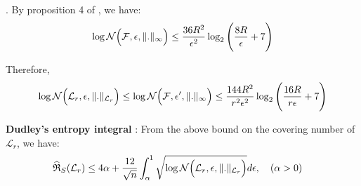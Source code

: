 \noindent \color{red}{Note that in $(*)$, we can equate the covering number with respect to $\|.\|_\infty$ of $\F$ with $W$ because we assume that $\|x\|_2\le 1$}.\color{black} By proposition 4 of \cite{article:ledent_and_mustafa}, we have:
\begin{align*}
    \log \mathcal{N}\Big( \mathcal{F}, \epsilon, \|.\|_\infty \Big) \le \frac{36R^2}{\epsilon^2} \log_2\Bigg( 
        \frac{8R}{\epsilon} + 7
     \Bigg)
\end{align*}

\noindent Therefore,
\begin{align*}
    \log \mathcal{N}\Big( \mathcal{L}_r, \epsilon, \|.\|_{\mathcal{L}_r} \Big) \le \log \mathcal{N}\Big( \mathcal{F}, \epsilon', \|.\|_\infty \Big) \le \frac{144R^2}{r^2\epsilon^2} \log_2\Bigg( 
        \frac{16R}{r\epsilon} + 7
     \Bigg)
\end{align*}

\noindent\textbf{Dudley's entropy integral} : From the above bound on the covering number of $\mathcal{L}_r$, we have:
\begin{align*}
    \widehat{\mathfrak{R}}_S(\mathcal{L}_r) &\le 4\alpha + \frac{12}{\sqrt n}\int_\alpha^1 \sqrt{\log \mathcal{N}\Big( \mathcal{L}_r, \epsilon, \|.\|_{\mathcal{L}_r} \Big) }d\epsilon, \ \ \ (\alpha > 0)
\end{align*}
